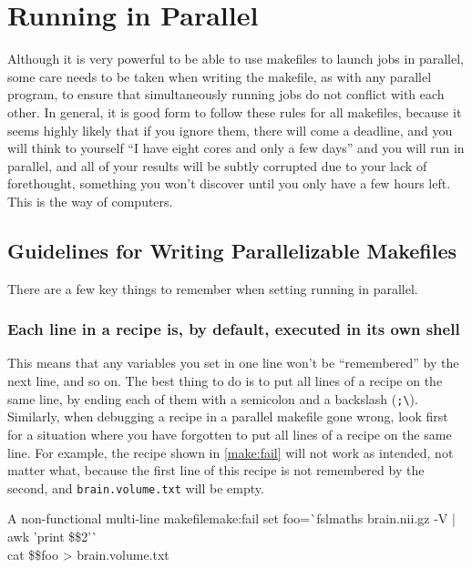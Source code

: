 \chapter{Running \maken{} in Parallel}
\label{chap:parallel}

Although it is very powerful to be able to use makefiles to launch jobs in parallel, some care needs to be taken when writing the makefile, as with any parallel program, to ensure that simultaneously running jobs do not conflict with each other. In general, it is good form to follow these rules for all makefiles, because it seems highly likely that if you ignore them, there will come a deadline, and you will think to yourself ``I have eight cores and only a few days'' and you will run \maken{} in parallel, and all of your results will be subtly corrupted due to your lack of forethought, something you won't discover until you only have a few hours left. This is the way of computers.

\section{Guidelines for Writing Parallelizable Makefiles}

There are a few key things to remember when setting running \maken{} in parallel.

\subsection{Each line in a recipe is, by default, executed in its own shell}

This means that any variables you set in one line won't be ``remembered'' by the next line, and so on. The best thing to do is to put all lines of a recipe on the same line, by ending each of them with a semicolon and a backslash (\texttt{;\textbackslash}). Similarly, when debugging a recipe in a parallel makefile gone wrong, look first for a situation where you have forgotten to put all lines of a recipe on the same line. For example, the recipe shown in \autoref{make:fail} will not work as intended, not matter what, because the first line of this recipe is not remembered by the second, and \texttt{brain.volume.txt} will be empty.
\begin{make}{A non-functional multi-line makefile}{make:fail}
	set foo=\`{}fslmaths brain.nii.gz -V | awk '{print \$\$2}'\`{} \\
	cat \$\$foo > brain.volume.txt
\end{make}


